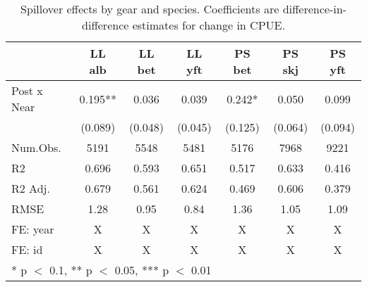 \begin{table}

\caption{\label{tab:spp_reg}Spillover effects by gear and species. Coefficients are
             difference-in-difference estimates for change in CPUE.}
\centering
\begin{tabular}[t]{lcccccc}
\toprule
  & LL alb & LL bet & LL yft & PS bet & PS skj & PS yft\\
\midrule
Post x Near & \num{0.195}** & \num{0.036} & \num{0.039} & \num{0.242}* & \num{0.050} & \num{0.099}\\
 & (\num{0.089}) & (\num{0.048}) & (\num{0.045}) & (\num{0.125}) & (\num{0.064}) & (\num{0.094})\\
\midrule
Num.Obs. & \num{5191} & \num{5548} & \num{5481} & \num{5176} & \num{7968} & \num{9221}\\
R2 & \num{0.696} & \num{0.593} & \num{0.651} & \num{0.517} & \num{0.633} & \num{0.416}\\
R2 Adj. & \num{0.679} & \num{0.561} & \num{0.624} & \num{0.469} & \num{0.606} & \num{0.379}\\
RMSE & \num{1.28} & \num{0.95} & \num{0.84} & \num{1.36} & \num{1.05} & \num{1.09}\\
FE: year & X & X & X & X & X & X\\
FE: id & X & X & X & X & X & X\\
\bottomrule
\multicolumn{7}{l}{\rule{0pt}{1em}* p $<$ 0.1, ** p $<$ 0.05, *** p $<$ 0.01}\\
\end{tabular}
\end{table}
